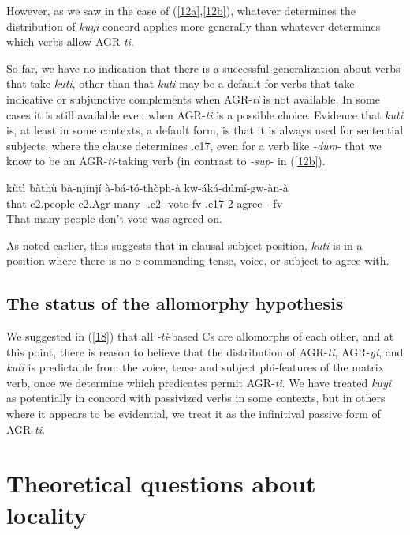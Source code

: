 \documentclass[output=paper,
modfonts
]{langscibook}
\begin{document}
However, as we saw in the case of (\ref{12a},\ref{12b}), whatever determines the distribution of \textit{kuyi} concord applies more generally than whatever determines which verbs allow AGR-\textit{ti}.

So far, we have no indication that there is a successful generalization about verbs that take \textit{kuti}, other than that \textit{kuti} may be a default for verbs that take indicative or subjunctive complements when AGR-\textit{ti} is not available. In some cases it is still available even when AGR-\textit{ti} is a possible choice. Evidence that \textit{kuti} is, at least in some contexts, a default form, is that it is always used for sentential subjects, where the clause determines .c17, even for a verb like \textit{-dum}- that we know to be an AGR-\textit{ti}-taking verb (in contrast to \textit{-sup}- in (\ref{12b}).

\ea\label{n23} \gll kùtì bàthù bà-njínjí à-bá-tó-thòph-à kw-áká-dúmí-gw-àn-à\\
      that c2.people c2.Agr-many -.c2--vote-fv .c17-2-agree---fv\\
	\glt That many people don't vote was agreed on. \z

As noted earlier, this suggests that in clausal subject position, \textit{kuti} is in a position where there is no c-commanding tense, voice, or subject to agree with.


\subsection{The status of the allomorphy hypothesis}

We suggested in (\ref{18}) that all \textit{-ti}-based Cs are allomorphs of each other, and at this point, there is reason to believe that the distribution of AGR-\textit{ti}, AGR-\textit{yi}, and \textit{kuti} is predictable from the voice, tense and subject phi-features of the matrix verb, once we determine which predicates permit AGR-\textit{ti}. We have treated \textit{kuyi} as potentially in concord with passivized verbs in some contexts, but in others where it appears to be evidential, we treat it as the infinitival passive form of AGR-\textit{ti}.

\section{Theoretical questions about locality}
\end{document}
